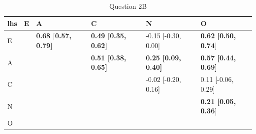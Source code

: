 \documentclass{article}\usepackage[]{graphicx}\usepackage[]{color}
\newenvironment{knitrout}{}{} %
\begin{document}
\begin{knitrout}
\begin{table}
\caption{\label{tab:unnamed-chunk-7}Question 2B}
\centering
\begin{tabular}[t]{llllll}
\toprule
lhs & E & A & C & N & O\\
\midrule
E &  & \textbf{0.68 [0.57, 0.79]} & \textbf{0.49 [0.35, 0.62]} & -0.15 [-0.30, 0.00] & \textbf{0.62 [0.50, 0.74]}\\
A &  &  & \textbf{0.51 [0.38, 0.65]} & \textbf{0.25 [0.09, 0.40]} & \textbf{0.57 [0.44, 0.69]}\\
C &  &  &  & -0.02 [-0.20, 0.16] & 0.11 [-0.06, 0.29]\\
N &  &  &  &  & \textbf{0.21 [0.05, 0.36]}\\
O &  &  &  &  & \\
\bottomrule
\end{tabular}
\end{table}


\end{knitrout}
\end{document}
